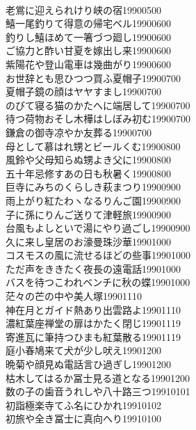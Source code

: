 \begin{multicols}{2}
\\老鴬に迎えられけり峡の宿\hfill{19900500}
\\鱚一尾釣りて得意の帰宅ベル\hfill{19900600}
\\釣りし鱚ほめて一箸づつ廻し\hfill{19900600}
\\ご協力と酢い甘夏を嫁出し来\hfill{19900600}
\\紫陽花や登山電車は幾曲がり\hfill{19900600}
\\お世辞とも思ひつつ買ふ夏帽子\hfill{19900700}
\\夏帽子鏡の顔はヤヤすまし\hfill{19900700}
\\のびて寝る猫のかたへに端居して\hfill{19900700}
\\待つ荷物おそし木樺はしぼみ初む\hfill{19900700}
\\鎌倉の御寺凉やか友葬る\hfill{19900700}
\\母として慕はれ甥とビールくむ\hfill{19900800}
\\風鈴や父母知らぬ甥よき父に\hfill{19900800}
\\五十年忌修すあの日も秋暑く\hfill{19900800}
\\巨寺にみちのくらしき萩まつり\hfill{19900900}
\\雨上がり紅たわヽなるりんご園\hfill{19900900}
\\子に孫にりんご送りて津軽旅\hfill{19900900}
\\台風もよしといで湯にやり過ごし\hfill{19900900}
\\久に来し皇居のお濠曼珠沙華\hfill{19901000}
\\コスモスの風に流せるほどの些事\hfill{19901000}
\\ただ声をききたく夜長の遠電話\hfill{19901000}
\\バスを待つこわれベンチに秋の蝶\hfill{19901000}
\\茫々の芒の中や美人塚\hfill{19901110}
\\神在月とガイド熱あり出雲路よ\hfill{19901110}
\\濃紅葉座禅堂の扉はかたく閉じ\hfill{19901119}
\\寄進瓦に筆持つひまも紅葉散る\hfill{19901119}
\\庭小春鳩来て犬が少し吠え\hfill{19901200}
\\晩菊や顔見ぬ電話言ひ過ぎし\hfill{19901200}
\\枯木してはるか冨士見る道となる\hfill{19901200}
\\数の子の歯音うれしや八十路三つ\hfill{19910101}
\\初詣極楽寺てふ名にひかれ\hfill{19910102}
\\初旅や全き冨士に真向へり\hfill{19910100}

\end{multicols}
